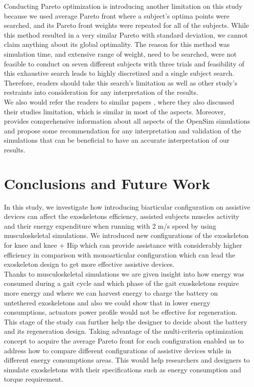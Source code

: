 \documentclass[10pt,letterpaper]{article}
\begin{document}
Conducting Pareto optimization is introducing another limitation on this study because we used average Pareto front where a subject's optima points were searched, and its Pareto front weights were repeated for all of the subjects. While this method resulted in a very similar Pareto with standard deviation, we cannot claim anything about its global optimality. The reason for this method was simulation time,  and extensive range of weight, need to be searched, were not feasible to conduct on seven different subjects with three trials and feasibility of this exhaustive search leads to highly discretized and a single subject search. Therefore, readers should take this search's limitation as well as other study's restraints into consideration for any interpretation of the results.\\
We also would refer the readers to similar papers \cite{2,93}, where they also discussed their studies limitation, which is similar in most of the aspects. Moreover,\cite{92} provides comprehensive information about all aspects of the OpenSim simulations and propose some recommendation for any interpretation and validation of the simulations that can be beneficial to have an accurate interpretation of our results.
\section*{\textbf{Conclusions and Future Work}}
In this study, we investigate how introducing biarticular configuration on assistive devices can affect the exoskeletons efficiency, assisted subjects muscles activity and their energy expenditure when running with 2 m/s speed by using musculoskeletal simulations. We introduced new configurations of the exoskeleton for knee and knee + Hip which can provide assistance with considerably higher efficiency in comparison with monoarticular configuration which can lead the exoskeleton design to get more effective assistive devices.\\
Thanks to musculoskeletal simulations we are given insight into how energy was consumed during a gait cycle and which phase of the gait exoskeletons require more energy and where we can harvest energy to charge the battery on untethered exoskeletons and also we could show that in lower energy consumptions, actuators power profile would not be effective for regeneration. This stage of the study can further help the designer to decide about the battery and its regeneration design.
Taking advantage of the multi-criteria optimization concept to acquire the average Pareto front for each configuration enabled us to address how to compare different configurations of assistive devices while in different energy consumptions areas. This would help researchers and designers to simulate exoskeletons with their specifications such as energy consumption and torque requirement.\\
\end{document}
